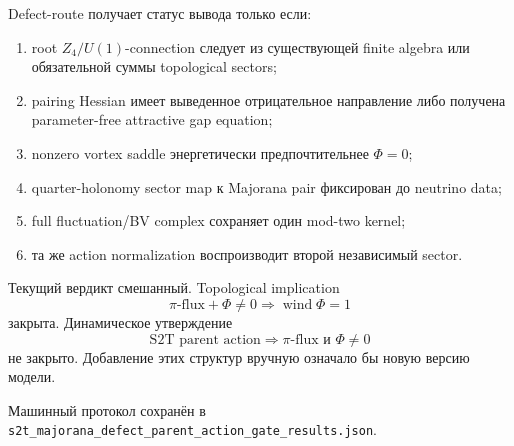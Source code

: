 \begin{protocol}
Defect-route получает статус вывода только если:
\begin{enumerate}
 \item root \(Z_4/U(1)\)-connection следует из существующей finite algebra
 или обязательной суммы topological sectors;
 \item pairing Hessian имеет выведенное отрицательное направление либо
 получена parameter-free attractive gap equation;
 \item nonzero vortex saddle энергетически предпочтительнее \(\Phi=0\);
 \item quarter-holonomy sector map к Majorana pair фиксирован до neutrino
 data;
 \item full fluctuation/BV complex сохраняет один mod-two kernel;
 \item та же action normalization воспроизводит второй независимый sector.
\end{enumerate}
\end{protocol}

Текущий вердикт смешанный. Topological implication
\[
 \pi\text{-flux}+\Phi\neq0\Longrightarrow\operatorname{wind}\Phi=1
\]
закрыта. Динамическое утверждение
\[
 \text{S2T parent action}\Longrightarrow \pi\text{-flux и }\Phi\neq0
\]
не закрыто. Добавление этих структур вручную означало бы новую версию
модели.

Машинный протокол сохранён в
\texttt{s2t\_majorana\_defect\_parent\_action\_gate\_results.json}.